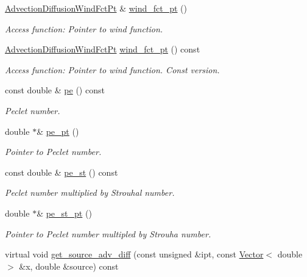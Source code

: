 \begin{DoxyCompactItemize}
\hyperlink{classoomph_1_1AdvectionDiffusionEquations_a341db90b2eaf704f3286a9fcde7c614a}{Advection\+Diffusion\+Wind\+Fct\+Pt} \& \hyperlink{classoomph_1_1AdvectionDiffusionEquations_a6f2e7c920f9789137fa6680832a5c338}{wind\+\_\+fct\+\_\+pt} ()
\begin{DoxyCompactList}\small\item\em Access function\+: Pointer to wind function. \end{DoxyCompactList}\item 
\hyperlink{classoomph_1_1AdvectionDiffusionEquations_a341db90b2eaf704f3286a9fcde7c614a}{Advection\+Diffusion\+Wind\+Fct\+Pt} \hyperlink{classoomph_1_1AdvectionDiffusionEquations_aafac11232d7d543efc4d08536b026f9a}{wind\+\_\+fct\+\_\+pt} () const
\begin{DoxyCompactList}\small\item\em Access function\+: Pointer to wind function. Const version. \end{DoxyCompactList}\item 
const double \& \hyperlink{classoomph_1_1AdvectionDiffusionEquations_ae1dd3fb5d07e98ad2a6b1e38f2f4dc3c}{pe} () const
\begin{DoxyCompactList}\small\item\em Peclet number. \end{DoxyCompactList}\item 
double $\ast$\& \hyperlink{classoomph_1_1AdvectionDiffusionEquations_a6757b4e9313b562812a21b49f167a114}{pe\+\_\+pt} ()
\begin{DoxyCompactList}\small\item\em Pointer to Peclet number. \end{DoxyCompactList}\item 
const double \& \hyperlink{classoomph_1_1AdvectionDiffusionEquations_ad23f5906cc0b088d778e1694719138e0}{pe\+\_\+st} () const
\begin{DoxyCompactList}\small\item\em Peclet number multiplied by Strouhal number. \end{DoxyCompactList}\item 
double $\ast$\& \hyperlink{classoomph_1_1AdvectionDiffusionEquations_aab0fe6d25a1506aea517e359e0e5e807}{pe\+\_\+st\+\_\+pt} ()
\begin{DoxyCompactList}\small\item\em Pointer to Peclet number multipled by Strouha number. \end{DoxyCompactList}\item 
virtual void \hyperlink{classoomph_1_1AdvectionDiffusionEquations_a3b8feaba7519dee3ed4a056c5dcf2bc2}{get\+\_\+source\+\_\+adv\+\_\+diff} (const unsigned \&ipt, const \hyperlink{classoomph_1_1Vector}{Vector}$<$ double $>$ \&x, double \&source) const

\end{DoxyCompactItemize}
